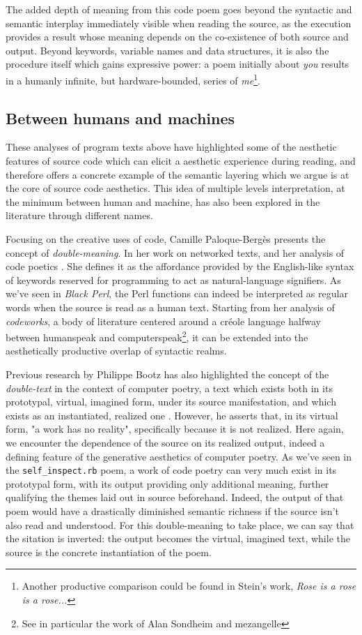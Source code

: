 The added depth of meaning from this code poem goes beyond the syntactic and semantic interplay immediately visible when reading the source, as the execution provides a result whose meaning depends on the co-existence of both source and output. Beyond keywords, variable names and data structures, it is also the procedure itself which gains expressive power: a poem initially about \emph{you} results in a humanly infinite, but hardware-bounded, series of \emph{me}\footnote{Another productive comparison could be found in Stein's work, \emph{Rose is a rose is a rose...}}.

\subsection{Between humans and machines}
\label{subsec:humans-machines}

These analyses of program texts above have highlighted some of the aesthetic features of source code which can elicit a aesthetic experience during reading, and therefore offers a concrete example of the semantic layering which we argue is at the core of source code aesthetics. This idea of multiple levels interpretation, at the minimum between human and machine, has also been explored in the literature through different names.

Focusing on the creative uses of code, Camille Paloque-Bergès presents the concept of \emph{double-meaning}. In her work on networked texts, and her analysis of code poetics \citep{paloque-berges_poetique_2009}. She defines it as the affordance provided by the English-like syntax of keywords reserved for programming to act as natural-language signifiers. As we've seen in \emph{Black Perl}, the Perl functions can indeed be interpreted as regular words when the source is read as a human text. Starting from her analysis of \emph{codeworks}, a body of literature centered around a créole language halfway between humanspeak and computerspeak\footnote{See in particular the work of Alan Sondheim and mezangelle}, it can be extended into the aesthetically productive overlap of syntactic realms.

Previous research by Philippe Bootz has also highlighted the concept of the \emph{double-text} in the context of computer poetry, a text which exists both in its prototypal, virtual, imagined form, under its source manifestation, and which exists as an instantiated, realized one \citep{bootz_problem_2005}. However, he asserts that, in its virtual form, "a work has no reality", specifically because  it is not realized. Here again, we encounter the dependence of the source on its realized output, indeed a defining feature of the generative aesthetics of computer poetry. As we've seen in the \lstinline{self_inspect.rb} poem, a work of code poetry can very much exist in its prototypal form, with its output providing only additional meaning, further qualifying the themes laid out in source beforehand. Indeed, the output of that poem would have a drastically diminished semantic richness if the source isn't also read and understood. For this double-meaning to take place, we can say that the sitation is inverted: the output becomes the virtual, imagined text, while the source is the concrete instantiation of the poem.

